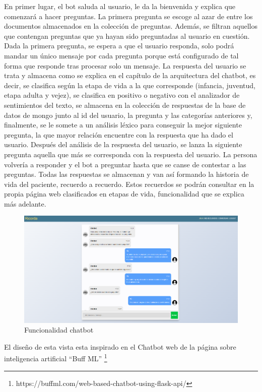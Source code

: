 En primer lugar, el bot saluda al usuario, le da la bienvenida y explica que comenzará a hacer preguntas. La primera pregunta se escoge al azar de entre los documentos almacenados en la colección de preguntas. Además, se filtran aquellos que contengan preguntas que ya hayan sido preguntadas al usuario en cuestión. Dada la primera pregunta, se espera a que el usuario responda, solo podrá mandar un único mensaje por cada pregunta porque está configurado de tal forma que responde tras procesar solo un mensaje. La respuesta del usuario se trata y almacena como se explica en el capítulo de la arquitectura del chatbot, es decir, se clasifica según la etapa de vida a la que corresponde (infancia, juventud, etapa adulta y vejez), se clasifica en positivo o negativo con el analizador de sentimientos del texto, se almacena en la colección de respuestas de la base de datos de mongo junto al id del usuario, la pregunta y las categorías anteriores y, finalmente, se le somete a un análisis léxico para conseguir la mejor siguiente pregunta, la que mayor relación encuentre con la respuesta que ha dado el usuario. Después del análisis de la respuesta del usuario, se lanza la siguiente pregunta aquella que más se corresponda con la respuesta del usuario. La persona volvería a responder y el bot a preguntar hasta que se canse de contestar a las preguntas. Todas las respuestas se almacenan y van así formando la historia de vida del paciente, recuerdo a recuerdo. Estos recuerdos se podrán consultar en la propia página web clasificados en etapas de vida, funcionalidad que se explica más adelante.

\begin{figure}[h]
	\centering
	\includegraphics[scale=0.4]{Imagenes/Vectorial/funcionalidad_chatbot}
	\caption{Funcionalidad chatbot}
	\label{fig:funcionalidadchatbot}
\end{figure}

El diseño de esta vista esta inspirado en el Chatbot web de la página sobre inteligencia artificial ``Buff ML'' \footnote{https://buffml.com/web-based-chatbot-using-flask-api/}

